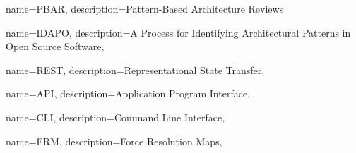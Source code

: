 

 {
name={PBAR},
description={Pattern-Based Architecture Reviews}
}

 {
name={IDAPO},
description={A Process for Identifying Architectural Patterns in Open Source Software},
}

 {
name={REST},
description={Representational State Transfer},
}

 {
name={API},
description={Application Program Interface},
}

 {
name={CLI},
description={Command Line Interface},
}

 {
name={FRM},
description={Force Resolution Maps},
}
